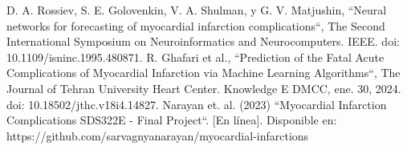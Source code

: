\documentclass[conference]{IEEEtran}
\begin{document}
\begin{thebibliography}{00}
 D. A. Rossiev, S. E. Golovenkin, V. A. Shulman, y G. V. Matjushin, ``Neural networks for forecasting of myocardial infarction complications``, The Second International Symposium on Neuroinformatics and Neurocomputers. IEEE. doi: 10.1109/isninc.1995.480871.
 R. Ghafari et al., ``Prediction of the Fatal Acute Complications of Myocardial Infarction via Machine Learning Algorithms``, The Journal of Tehran University Heart Center. Knowledge E DMCC, ene. 30, 2024. doi: 10.18502/jthc.v18i4.14827.
 Narayan et. al. (2023) ``Myocardial Infarction Complications SDS322E - Final Project``. [En línea]. Disponible en: https://github.com/sarvagnyanarayan/myocardial-infarctions
\end{thebibliography} 
\end{document}
